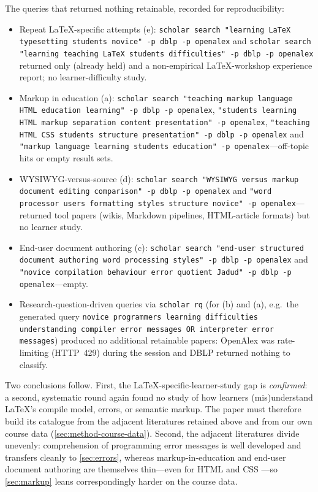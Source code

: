 The queries that returned nothing retainable, recorded for reproducibility:
\begin{itemize}
  \item Repeat LaTeX-specific attempts (e):
    \texttt{scholar search "learning LaTeX typesetting students novice" -p
    dblp -p openalex} and \texttt{scholar search "learning teaching LaTeX
    students difficulties" -p dblp -p openalex} returned only
    \autocite{Knauff2014Latex} (already held) and a non-empirical
    LaTeX-workshop experience report; no learner-difficulty study.
  \item Markup in education (a):
    \texttt{scholar search "teaching markup language HTML education
    learning" -p dblp -p openalex},
    \texttt{"students learning HTML markup separation content
    presentation" -p openalex},
    \texttt{"teaching HTML CSS students structure presentation" -p dblp -p
    openalex} and \texttt{"markup language learning students education" -p
    openalex}---off-topic hits or empty result sets.
  \item WYSIWYG-versus-source (d):
    \texttt{scholar search "WYSIWYG versus markup document editing
    comparison" -p dblp -p openalex} and \texttt{"word processor users
    formatting styles structure novice" -p openalex}---returned tool papers
    (wikis, Markdown pipelines, HTML-article formats) but no learner study.
  \item End-user document authoring (c):
    \texttt{scholar search "end-user structured document authoring word
    processing styles" -p dblp -p openalex} and
    \texttt{"novice compilation behaviour error quotient Jadud" -p dblp -p
    openalex}---empty.
  \item Research-question-driven queries via \texttt{scholar rq} (for (b)
    and (a), e.g.\ the generated query \texttt{novice programmers learning
    difficulties understanding compiler error messages OR interpreter error
    messages}) produced no additional retainable papers: OpenAlex was
    rate-limiting (HTTP~429) during the session and DBLP returned nothing to
    classify.
\end{itemize}

Two conclusions follow.
First, the LaTeX-specific-learner-study gap is \emph{confirmed}: a second,
systematic round again found no study of how learners (mis)understand
LaTeX's compile model, errors, or semantic markup.
The paper must therefore build its catalogue from the adjacent literatures
retained above and from our own course data
(\cref{sec:method-course-data}).
Second, the adjacent literatures divide unevenly: comprehension of
programming error messages is well developed and transfers cleanly to
\cref{sec:errors}, whereas markup-in-education and end-user document
authoring are themselves thin---even for HTML and CSS
\autocite{Kharchenko2025WebDesign}---so \cref{sec:markup} leans
correspondingly harder on the course data.

